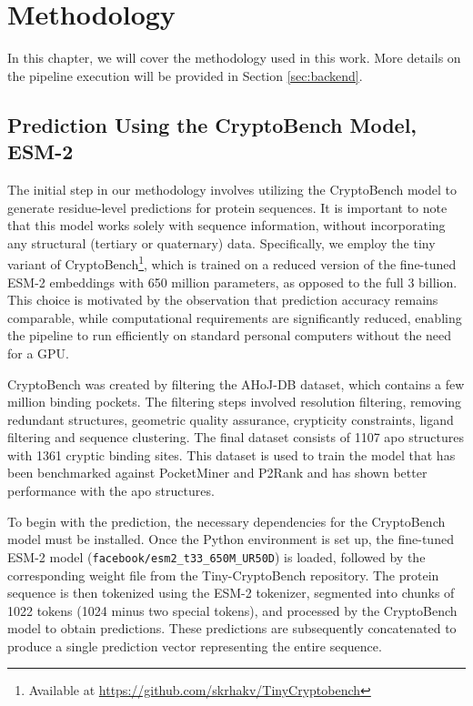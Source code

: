 \chapter{Methodology}
\label{chap:methodology}

In this chapter, we will cover the methodology used in this work. More details on the pipeline execution will be provided in Section \ref{sec:backend}.

\section{Prediction Using the CryptoBench Model, ESM-2}
\label{sec:prediction}

The initial step in our methodology involves utilizing the CryptoBench \cite{vskrhak2025cryptobench} model to generate residue-level predictions for protein sequences. It is important to note that this model works solely with sequence information, without incorporating any structural (tertiary or quaternary) data. Specifically, we employ the tiny variant of CryptoBench\footnote{Available at \url{https://github.com/skrhakv/TinyCryptobench}}, which is trained on a reduced version of the fine-tuned ESM-2 embeddings \cite{lin2022language} with 650 million parameters, as opposed to the full 3 billion. This choice is motivated by the observation that prediction accuracy remains comparable, while computational requirements are significantly reduced, enabling the pipeline to run efficiently on standard personal computers without the need for a GPU.

CryptoBench was created by filtering the AHoJ-DB \cite{feidakis2024ahoj} dataset, which contains a few million binding pockets. The filtering steps involved resolution filtering, removing redundant structures, geometric quality assurance, crypticity constraints, ligand filtering and sequence clustering. The final dataset consists of 1107 apo structures with 1361 cryptic binding sites. This dataset is used to train the model that has been benchmarked against PocketMiner \cite{meller2023predicting} and P2Rank \cite{krivak2018p2rank} and has shown better performance with the apo structures.

\sloppy
To begin with the prediction, the necessary dependencies for the CryptoBench model must be installed. Once the Python environment is set up, the fine-tuned ESM-2 model (\lstinline!facebook/esm2_t33_650M_UR50D!) is loaded, followed by the corresponding weight file from the Tiny-CryptoBench repository. The protein sequence is then tokenized using the ESM-2 tokenizer, segmented into chunks of 1022 tokens (1024 minus two special tokens), and processed by the CryptoBench model to obtain predictions. These predictions are subsequently concatenated to produce a single prediction vector representing the entire sequence.

